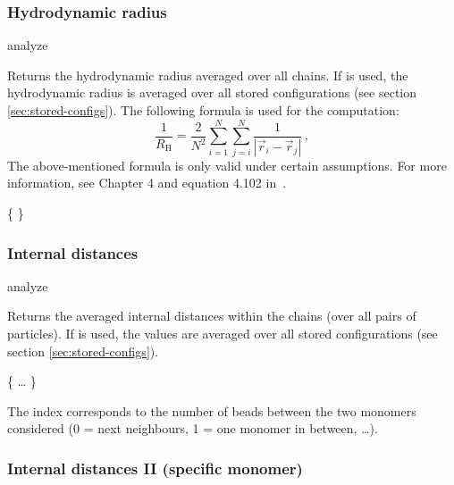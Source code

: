 \subsubsection{Hydrodynamic radius}
\begin{essyntax}
  analyze  
\end{essyntax}
Returns the hydrodynamic radius averaged over all chains.  
If  is used, the hydrodynamic radius is averaged over all stored
configurations (see section \vref{sec:stored-configs}).
The following formula is used for the computation:
\begin{equation}
\label{eq:Rh}
\frac{1}{R_{\mathrm H}} = \frac{2}{N^2} \sum\limits_{i=1}^{N} \sum\limits_{j=i}^{N} \frac{1}{|\vec r_i - \vec r_j|}\,,
\end{equation}
The above-mentioned formula is only valid under certain assumptions.
For more information, see Chapter 4 and equation 4.102 in~\cite{doi86a}.
\begin{code}
\{   \}
\end{code}

\subsubsection{Internal distances}
\begin{essyntax}
 analyze  
\end{essyntax}
Returns the averaged internal distances within the chains (over
all pairs of particles).  
If  is used, the values are averaged over all stored
configurations (see section \vref{sec:stored-configs}).
\begin{code}
\{   \dots {} \}
\end{code}
The index corresponds to the number of beads between the two monomers
considered (0 = next neighbours, 1 = one monomer in between, \dots).

\subsubsection{Internal distances II (specific monomer)}

